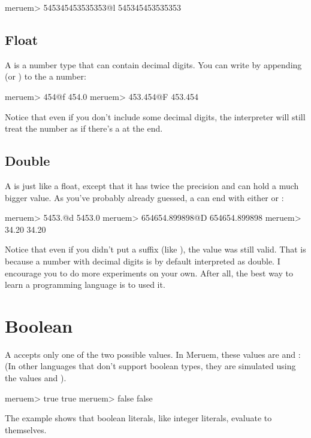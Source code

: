 \begin{REPL}
meruem> 545345453535353@l
545345453535353
\end{REPL}

\subsection{Float}
A  is a number type that can contain decimal digits. You can write  by appending  (or ) to the a number:

\begin{REPL}
meruem> 454@f
454.0
meruem> 453.454@F
453.454
\end{REPL}

Notice that even if you don't include some decimal digits, the interpreter will still treat the number as if there's a  at the end.

\subsection{Double}
A  is just like a float, except that it has twice the precision and can hold a much bigger value. As you've probably already guessed, a  can end with either  or :

\begin{REPL}
meruem> 5453.@d
5453.0
meruem> 654654.899898@D
654654.899898
meruem> 34.20
34.20
\end{REPL}

Notice that even if you didn't put a suffix (like ), the value was still valid. That is because a number with decimal digits is by default interpreted as double. I encourage you to do more experiments on your own. After all, the best way to learn a programming language is to used it.

\section{Boolean}
A  accepts only one of the two possible values. In Meruem, these values are  and : (In other languages that don't support boolean types, they are simulated using the values  and ). 

\begin{REPL}
meruem> true
true
meruem> false
false
\end{REPL}

The example shows that boolean literals, like integer literals, evaluate to themselves.

